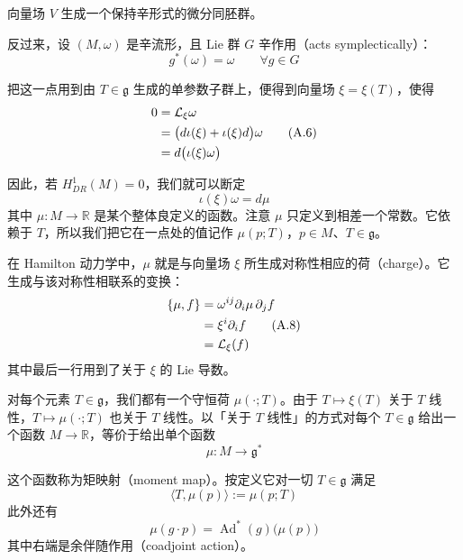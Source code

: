 向量场 $V$ 生成一个保持辛形式的微分同胚群。

反过来，设 $(M,\omega)$ 是辛流形，且 Lie 群 $G$ 辛作用（acts symplectically）：
\begin{equation}
  g^{*}(\omega)=\omega\qquad\forall g\in G
  \tag{A.5}
  \label{eq:A.5}
\end{equation}

把这一点用到由 $T\in\mathfrak{g}$ 生成的单参数子群上，便得到向量场 $\xi=\xi(T)$，使得
\begin{align}
  0 &= \mathcal{L}_{\xi}\omega \notag\\
    &= \big(d\iota(\xi)+\iota(\xi)d\big)\omega \label{eq:A.6}\tag{A.6}\\
    &= d\big(\iota(\xi)\omega\big) \notag
\end{align}

因此，若 $H^{1}_{DR}(M)=0$，我们就可以断定
\begin{equation}
  \iota(\xi)\omega=d\mu
  \tag{A.7}
  \label{eq:A.7}
\end{equation}
其中 $\mu:M\to\mathbb{R}$ 是某个整体良定义的函数。注意 $\mu$ 只定义到相差一个常数。它依赖于 $T$，所以我们把它在一点处的值记作 $\mu(p;T)$，$p\in M$、$T\in\mathfrak{g}$。

在 Hamilton 动力学中，$\mu$ 就是与向量场 $\xi$ 所生成对称性相应的荷（charge）。它生成与该对称性相联系的变换：
\begin{align}
  \{\mu,f\} &= \omega^{ij}\partial_i\mu\,\partial_jf \notag\\
           &= \xi^i\partial_if \label{eq:A.8}\tag{A.8}\\
           &= \mathcal{L}_{\xi}(f) \notag
\end{align}
其中最后一行用到了关于 $\xi$ 的 Lie 导数。

对每个元素 $T\in\mathfrak{g}$，我们都有一个守恒荷 $\mu(\cdot;T)$。由于 $T\mapsto\xi(T)$ 关于 $T$ 线性，$T\mapsto\mu(\cdot;T)$ 也关于 $T$ 线性。以「关于 $T$ 线性」的方式对每个 $T\in\mathfrak{g}$ 给出一个函数 $M\to\mathbb{R}$，等价于给出单个函数
\begin{equation}
  \mu:M\to\mathfrak{g}^{*}
  \tag{A.9}
  \label{eq:A.9}
\end{equation}

这个函数称为矩映射（moment map）。按定义它对一切 $T\in\mathfrak{g}$ 满足
\begin{equation}
  \langle T,\mu(p)\rangle:=\mu(p;T)
  \tag{A.10}
  \label{eq:A.10}
\end{equation}
此外还有
\begin{equation}
  \mu(g\cdot p)=\operatorname{Ad}^{*}(g)\big(\mu(p)\big)
  \tag{A.11}
  \label{eq:A.11}
\end{equation}
其中右端是余伴随作用（coadjoint action）。

